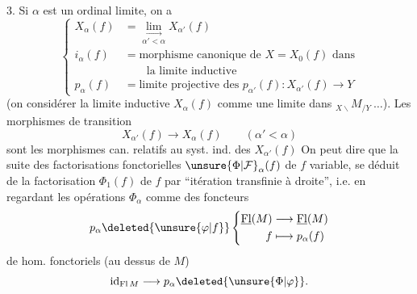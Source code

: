 3. Si $\alpha$ est un ordinal limite, on a
\[
\left\{\begin{aligned}
X_\alpha(f)&=\underset{\alpha'<\alpha}{\underset{\longrightarrow}{\lim}}X_{\alpha'}(f)\\
i_\alpha(f)&=\text{morphisme canonique de }X=X_0(f)\text{ dans}\\
&\qquad\text{la limite inductive}\\
p_\alpha(f)&=\text{limite projective des }p_{\alpha'}(f):X_{\alpha'}(f)\longrightarrow Y
\end{aligned}\right.
\]
(on  considérer la limite inductive  $X_\alpha(f)$ comme une limite dans ${}_{X\backslash}M_{/Y}\ \ldots$).
Les morphismes de transition
\[X_{\alpha'}(f)\longrightarrow X_\alpha(f)\qquad(\alpha'<\alpha)\]
sont les morphismes can. relatifs au syst. ind. des $X_{\alpha'}(f)$
On peut  dire que la suite  des factorisations fonctorielles $\unsure{\Phi|\mathcal F}_\alpha(f)$ de $f$ variable, se déduit de la factorisation  $\Phi_1(f)$ de $f$
par ``itération transfinie à droite'', i.e. en regardant les opérations $\Phi_\alpha$ comme des foncteurs
\[
p_\alpha\deleted{\unsure{\varphi|f}}\left\{\begin{aligned}
\underline{\mathrm{Fl}}(M)&\longrightarrow\underline{\mathrm{Fl}}(M)\\
f&\longmapsto p_\alpha(f)
\end{aligned}\right.
\]
 de  hom. fonctoriels (au dessus de $M$)
\[\mathrm{id}_{\mathrm{Fl}\,M}\longrightarrow p_\alpha\deleted{\unsure{\Phi|\varphi}}.\]

